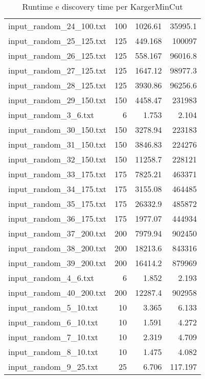 \begin{table}[H]
\begin{tabular}{lrrr}
     input\_random\_24\_100.txt &     100 &         1026.61  &      35995.1   \\
     input\_random\_25\_125.txt &     125 &          449.168 &     100097     \\
     input\_random\_26\_125.txt &     125 &          558.167 &      96016.8   \\
     input\_random\_27\_125.txt &     125 &         1647.12  &      98977.3   \\
     input\_random\_28\_125.txt &     125 &         3930.86  &      96256.6   \\
     input\_random\_29\_150.txt &     150 &         4458.47  &     231983     \\
     input\_random\_3\_6.txt    &       6 &            1.753 &          2.104 \\
     input\_random\_30\_150.txt &     150 &         3278.94  &     223183     \\
     input\_random\_31\_150.txt &     150 &         3846.83  &     224276     \\
     input\_random\_32\_150.txt &     150 &        11258.7   &     228121     \\
     input\_random\_33\_175.txt &     175 &         7825.21  &     463371     \\
     input\_random\_34\_175.txt &     175 &         3155.08  &     464485     \\
     input\_random\_35\_175.txt &     175 &        26332.9   &     485872     \\
     input\_random\_36\_175.txt &     175 &         1977.07  &     444934     \\
     input\_random\_37\_200.txt &     200 &         7979.94  &     902450     \\
     input\_random\_38\_200.txt &     200 &        18213.6   &     843316     \\
     input\_random\_39\_200.txt &     200 &        16414.2   &     879969     \\
     input\_random\_4\_6.txt    &       6 &            1.852 &          2.193 \\
     input\_random\_40\_200.txt &     200 &        12287.4   &     902958     \\
     input\_random\_5\_10.txt   &      10 &            3.365 &          6.133 \\
     input\_random\_6\_10.txt   &      10 &            1.591 &          4.272 \\
     input\_random\_7\_10.txt   &      10 &            2.319 &          4.709 \\
     input\_random\_8\_10.txt   &      10 &            1.475 &          4.082 \\
     input\_random\_9\_25.txt   &      25 &            6.706 &        117.197 \\
     \hline
    \end{tabular}

    \caption{Runtime e discovery time per KargerMinCut}
    \label{table:karger-running-time}
\end{table}

